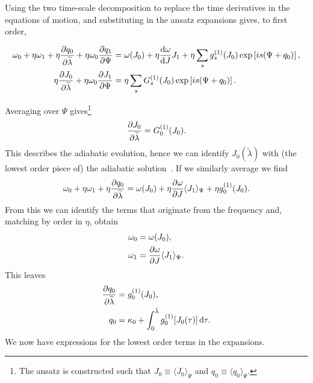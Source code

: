 Using the two time-scale decomposition to replace the time derivatives in the equations of motion, and substituting in the ansatz expansions gives, to first order,
\begin{widetext}
\begin{subequations}
\begin{align}
\label{eq:q-1}
\omega_0 + \eta\omega_1 + \eta\dfrac{\partial {q_0}}{\partial {\widetilde{\lambda}}} + \eta\omega_0\dfrac{\partial {q_1}}{\partial {\Psi}} = {} & \omega(J_0) + \eta\dfrac{\mathrm{d} {\omega}}{\mathrm{d} {J}}J_1 + \eta \sum_s g_s^{(1)}(J_0)\exp\left[is(\Psi + q_0)\right], \\
\eta\dfrac{\partial {J_0}}{\partial {\widetilde{\lambda}}} + \eta\omega_0\dfrac{\partial {J_1}}{\partial {\Psi}} = {} & \eta \sum_s G_s^{(1)}(J_0)\exp\left[is(\Psi + q_0)\right].
\label{eq:J-1}
\end{align}
\end{subequations}
\end{widetext}
Averaging  over $\Psi$ gives\footnote{The ansatz is constructed such that $J_0 \equiv \langle J_0\rangle_\Psi$ and $q_0 \equiv \langle q_0\rangle_\Psi$.}
\begin{equation}
\dfrac{\partial {J_0}}{\partial {\widetilde{\lambda}}} = G_0^{(1)}(J_0).
\label{eq:J-ad}
\end{equation}
This describes the adiabatic evolution, hence we can identify $J_0\left(\widetilde{\lambda}\right)$ with (the lowest order piece of) the adiabatic solution~\cite{Hinderer2008}. If we similarly average  we find
\begin{equation}
\omega_0 + \eta\omega_1 +\eta\dfrac{\partial {q_0}}{\partial {\widetilde{\lambda}}} = \omega(J_0) + \eta\dfrac{\partial {\omega}}{\partial {J}}\langle J_1\rangle_\Psi + \eta g_0^{(1)}(J_0).
\end{equation}
From this we can identify the terms that originate from the frequency and, matching by order in $\eta$, obtain
\begin{subequations}
\begin{align}
\omega_0 = {} & \omega(J_0), \\
\omega_1 = {} & \dfrac{\partial {\omega}}{\partial {J}}\langle J_1\rangle_\Psi.
\end{align}
\end{subequations}
This leaves
\begin{align}
\dfrac{\partial {q_0}}{\partial {\widetilde{\lambda}}} = {} & g_0^{(1)}(J_0), \\
q_0 = {} & \kappa_0 + \int_{0}^{\tilde{\lambda}}{g_0^{(1)}[J_0(\tau)]}\,\mathrm{d}{\tau}.
\label{eq:q-0-sol}
\end{align}
We now have expressions for the lowest order terms in the expansions.

